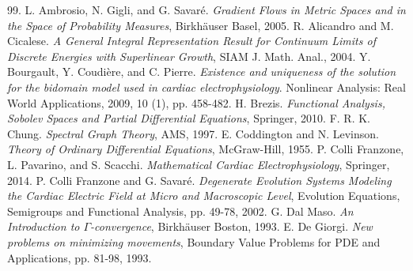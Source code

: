 \documentclass[a4paper,11pt]{article}
\theoremstyle{definition}
\numberwithin{equation}{section}
\begin{document}
\begin{thebibliography}{99.}
	 L. Ambrosio, N. Gigli, and G. Savar\'e. \textit{Gradient Flows in Metric Spaces and in the Space of Probability Measures}, Birkh\"auser Basel, 2005.
	 R. Alicandro and M. Cicalese. \textit{A General Integral Representation Result for Continuum Limits of Discrete Energies with Superlinear Growth}, SIAM J. Math. Anal., 2004.
	 Y. Bourgault, Y. Coudi\`ere, and C. Pierre. \textit{Existence and uniqueness of the solution for the bidomain model used in cardiac electrophysiology}. Nonlinear Analysis: Real World Applications, 2009, 10 (1), pp. 458-482.
	 H. Brezis. \textit{Functional Analysis, Sobolev Spaces and Partial Differential Equations}, Springer, 2010.
	 F. R. K. Chung. \textit{Spectral Graph Theory}, AMS, 1997.
	 E. Coddington and N. Levinson. \textit{Theory of Ordinary Differential Equations}, McGraw-Hill, 1955.
	 P. Colli Franzone, L. Pavarino, and S. Scacchi. \textit{Mathematical Cardiac Electrophysiology}, Springer, 2014.
	 P. Colli Franzone and G. Savar\'e. \textit{Degenerate Evolution Systems Modeling the Cardiac Electric Field at Micro and Macroscopic Level}, Evolution Equations, Semigroups and Functional Analysis, pp. 49-78, 2002.
	  G. Dal Maso. \textit{An Introduction to $\Gamma$-convergence}, Birkh\"auser Boston, 1993.
	 E. De Giorgi. \textit{New problems on minimizing movements}, 
	Boundary Value Problems for PDE and Applications, pp. 81-98, 1993.

\end{thebibliography}
\end{document}
